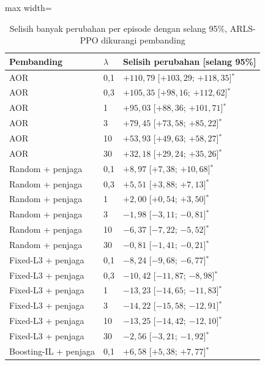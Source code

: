 \begin{table}[htbp]
\caption{Selisih banyak perubahan per episode dengan selang 95\%, ARLS-PPO dikurangi pembanding}
\label{tab:uji-perubahan-selang}
\centering\footnotesize
\setlength{\tabcolsep}{4pt}
\begin{adjustbox}{max width=\textwidth}
\begin{tabular}{lll}
\toprule
Pembanding & $\lambda$ & Selisih perubahan [selang 95\%] \\
\midrule
AOR & 0{,}1 & $+110{,}79$ [$+103{,}29$; $+118{,}35$]$^{*}$ \\
AOR & 0{,}3 & $+105{,}35$ [$+98{,}16$; $+112{,}62$]$^{*}$ \\
AOR & 1 & $+95{,}03$ [$+88{,}36$; $+101{,}71$]$^{*}$ \\
AOR & 3 & $+79{,}45$ [$+73{,}58$; $+85{,}22$]$^{*}$ \\
AOR & 10 & $+53{,}93$ [$+49{,}63$; $+58{,}27$]$^{*}$ \\
AOR & 30 & $+32{,}18$ [$+29{,}24$; $+35{,}26$]$^{*}$ \\
\addlinespace
Random + penjaga & 0{,}1 & $+8{,}97$ [$+7{,}38$; $+10{,}68$]$^{*}$ \\
Random + penjaga & 0{,}3 & $+5{,}51$ [$+3{,}88$; $+7{,}13$]$^{*}$ \\
Random + penjaga & 1 & $+2{,}00$ [$+0{,}54$; $+3{,}50$]$^{*}$ \\
Random + penjaga & 3 & $-1{,}98$ [$-3{,}11$; $-0{,}81$]$^{*}$ \\
Random + penjaga & 10 & $-6{,}37$ [$-7{,}22$; $-5{,}52$]$^{*}$ \\
Random + penjaga & 30 & $-0{,}81$ [$-1{,}41$; $-0{,}21$]$^{*}$ \\
\addlinespace
Fixed-L3 + penjaga & 0{,}1 & $-8{,}24$ [$-9{,}68$; $-6{,}77$]$^{*}$ \\
Fixed-L3 + penjaga & 0{,}3 & $-10{,}42$ [$-11{,}87$; $-8{,}98$]$^{*}$ \\
Fixed-L3 + penjaga & 1 & $-13{,}23$ [$-14{,}65$; $-11{,}83$]$^{*}$ \\
Fixed-L3 + penjaga & 3 & $-14{,}22$ [$-15{,}58$; $-12{,}91$]$^{*}$ \\
Fixed-L3 + penjaga & 10 & $-13{,}25$ [$-14{,}42$; $-12{,}10$]$^{*}$ \\
Fixed-L3 + penjaga & 30 & $-2{,}56$ [$-3{,}21$; $-1{,}92$]$^{*}$ \\
\addlinespace
Boosting-IL + penjaga & 0{,}1 & $+6{,}58$ [$+5{,}38$; $+7{,}77$]$^{*}$ \\

\end{tabular}
\end{adjustbox}
\end{table}

